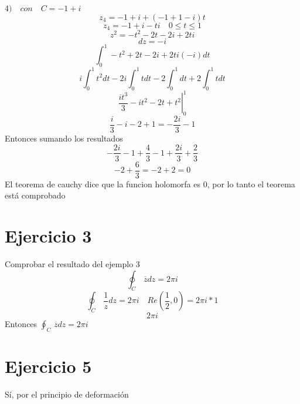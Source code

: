 \documentclass{article}
\begin{document}
\(4) \quad con \quad C= -1+i \) 
\begin{equation}
z_4=-1+i+(-1+1-i)t
\end{equation}
\begin{equation}
z_4=-1+i-ti \quad 0\leq t \leq 1
\end{equation}
\begin{equation}
z^2=-t^2-2t-2i+2ti
\end{equation}
\begin{equation}
dz=-i
\end{equation}
\begin{equation}
\int_{0}^{1} -t^2+2t-2i+2ti(-i)dt
\end{equation}
\begin{equation}
i\int_{0}^{1} t^2dt -2i\int_{0}^{1} tdt -2\int_{0}^{1}dt+2\int_{0}^{1}tdt
\end{equation}
\begin{equation}
\left.\frac{it^3}{3} -it^2-2t+t^2\right|_{0}^{1}
\end{equation}
\begin{equation}
\frac{i}{3}-i-2+1=-\frac{2i}{3}-1
\end{equation}
Entonces sumando los resultados
\begin{equation}
-\frac{2i}{3}-1+\frac{4}{3}-1+\frac{2i}{3}+\frac{2}{3}
\end{equation}
\begin{equation}
-2+\frac{6}{3}=-2+2=0
\end{equation}
El teorema de cauchy dice que la funcion holomorfa es 0, por lo tanto el teorema está comprobado


\section{Ejercicio 3}
Comprobar el resultado del ejemplo 3
\[
\oint_{C}  \, \overline{z} dz = 2\pi i
\]
\begin{equation}
\oint_{C}  \, \frac{1}{z}dz=2\pi i\quad Re \left( \frac{1}{2},0\right)=2\pi i *1
\end{equation}
\begin{equation}
2\pi i
\end{equation}
Entonces \( \oint_{C}  \, \overline{z} dz=2\pi i\) 


\section{Ejercicio 5}
Sí, por el principio de deformación
\end{document}
